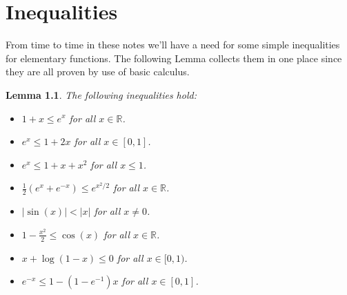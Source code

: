 \documentclass{amsbook}
\newtheorem{lem}[thm]{Lemma}
\theoremstyle{definition}
\theoremstyle{remark}
\newcommand{\reals}{\mathbb{R}}
\newcommand{\abs}[1]{\left \vert #1 \right \vert}
\begin{document}
\chapter{Inequalities}
From time to time in these notes we'll have a need for some simple
inequalities for elementary functions.  The following Lemma collects
them in one place since they are all proven by use of basic calculus.
\begin{lem}\label{BasicExponentialInequalities}The following
  inequalities hold:
\begin{itemize}
\item[(i)] $1+x \leq e^x$ for all $x \in \reals$.
\item[(ii)] $e^x \leq 1 + 2x$ for all $x \in [0,1]$.
\item[(iii)] $e^x \leq 1 + x + x^2$ for all $x \leq 1$.
\item[(iv)] $\frac{1}{2}(e^x + e^{-x}) \leq e^{x^2/2}$ for all $x \in \reals$.
\item[(v)] $\abs{\sin(x)} < \abs{x}$ for all $x  \neq 0$.
\item[(vi)] $1 - \frac{x^2}{2} \leq \cos(x)$ for all $x \in \reals$.
\item[(vii)] $x + \log(1-x) \leq 0$ for all $x \in [0,1)$.
\item[(viii)] $e^{-x} \leq 1 - (1 - e^{-1}) x$ for all $x \in [0,1]$.
\end{itemize}
\end{lem}
\end{document}
